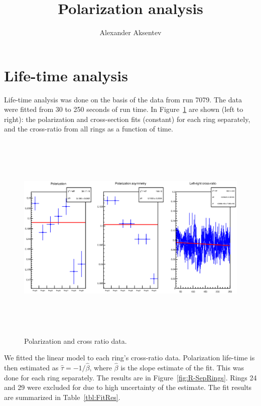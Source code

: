 \documentclass{article}
\begin{document}
\title{Polarization analysis}
\author{Alexander Aksentev}
\maketitle
	
\section{Life-time analysis}
Life-time analysis was done on the basis of the data from run 7079. The data were fitted from 30 to 250 seconds of run time. In Figure~\ref{fig:ROOT-AllRings} are shown (left to right): the polarization and cross-section fits (constant) for each ring separately, and the cross-ratio from all rings as a function of time.
\begin{figure}[h]
	\centering
	\includegraphics[height=4in, width=8in, keepaspectratio=false]{PolAna-ROOT-all.eps}
	\caption{Polarization and  cross ratio data.\label{fig:ROOT-AllRings}}
\end{figure}

We fitted the linear model to each ring's cross-ratio data. Polarization life-time is then estimated as $\hat{\tau} = -1/\hat{\beta}$, where $\hat{\beta}$ is the slope estimate of the fit. This was done for each ring separately. The results are in Figure~\ref{fig:R-SepRings}. Rings 24 and 29  were excluded for due to high uncertainty of the estimate. The fit results are summarized in Table~\ref{tbl:FitRes}.
\end{document}
